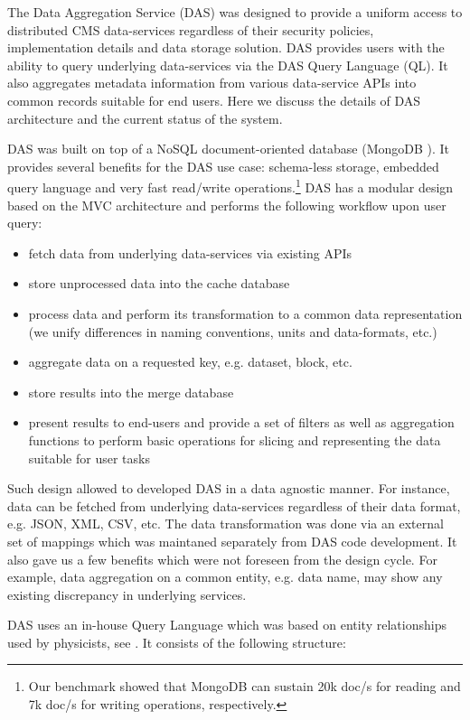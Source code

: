 
The Data Aggregation Service (DAS) \cite{DAS} was designed to provide a uniform
access to distributed CMS data-services regardless of their security policies,
implementation details and data storage solution. DAS provides users with the ability to
query underlying data-services via the DAS Query Language (QL). It also aggregates
metadata information from various data-service APIs into common records
suitable for end users. Here we discuss the details of DAS architecture and the
current status of the system.

DAS was built on top of a NoSQL document-oriented database (MongoDB
\cite{MongoDB}). It provides several benefits for the DAS use case: schema-less
storage, embedded query language and very fast read/write
operations.\footnote{Our benchmark showed that MongoDB can sustain 20k doc/s
for reading and 7k doc/s for writing operations, respectively.}
DAS has a modular design based on the MVC architecture \cite{MVC} and performs the
following workflow upon user query:

\begin{itemize}
\item fetch data from underlying data-services via existing APIs
\item store unprocessed data into the cache database
\item process data and perform its transformation to a common data representation
(we unify differences in naming conventions, units and data-formats, etc.)
\item aggregate data on a requested key, e.g. dataset, block, etc.
\item store results into the merge database
\item present results to end-users and provide a set of filters as well as
aggregation functions to perform basic operations for slicing and representing
the data suitable for user tasks
\end{itemize}

Such design allowed to developed DAS in a data agnostic manner. For instance,
data can be fetched from underlying data-services regardless of their data format, e.g.
JSON, XML, CSV, etc. The data transformation was done via an external set of
mappings which was maintaned separately from DAS code development. It also gave
us a few benefits which were not foreseen from the design cycle. For example,
data aggregation on a common entity, e.g. data name, may show any existing discrepancy in
underlying services.

DAS uses an in-house Query Language which was based on entity relationships used by
physicists, see \cite{DAS}. It consists of the following structure:

